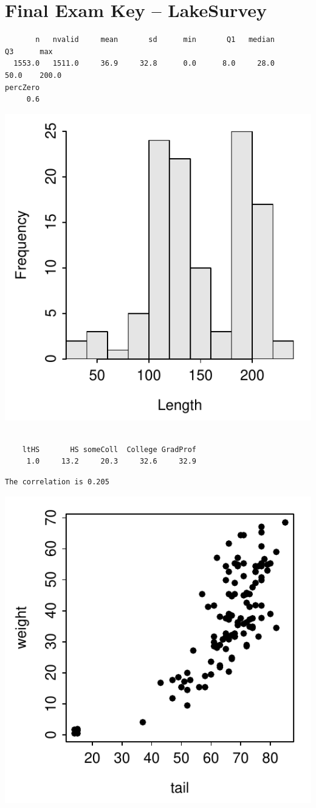\documentclass{article}\usepackage[]{graphicx}\usepackage[]{color}
\makeatletter
\newenvironment{kframe}{%
 \def\at@end@of@kframe{}%
 \ifinner\ifhmode%
  \def\at@end@of@kframe{\end{minipage}}%
  \begin{minipage}{\columnwidth}%
 \fi\fi%
 \def\FrameCommand##1{\hskip\@totalleftmargin \hskip-\fboxsep
 \colorbox{shadecolor}{##1}\hskip-\fboxsep
     \hskip-\linewidth \hskip-\@totalleftmargin \hskip\columnwidth}%
 \MakeFramed {\advance\hsize-\width
   \@totalleftmargin\z@ \linewidth\hsize
   \@setminipage}}%
 {\par\unskip\endMakeFramed%
 \at@end@of@kframe}
\newenvironment{knitrout}{}{} %
\makeatother
\begin{document}
\section*{Final Exam Key -- LakeSurvey}


\begin{knitrout}
\color{fgcolor}\begin{kframe}
\begin{verbatim}
       n   nvalid     mean       sd      min       Q1   median       Q3      max 
  1553.0   1511.0     36.9     32.8      0.0      8.0     28.0     50.0    200.0 
percZero 
     0.6 
\end{verbatim}
\end{kframe}

{\centering \includegraphics[width=.4\linewidth]{Figs/unnamed-chunk-1-1} 

}



\end{knitrout}
\begin{knitrout}
\color{fgcolor}\begin{kframe}
\begin{verbatim}

    ltHS       HS someColl  College GradProf 
     1.0     13.2     20.3     32.6     32.9 
\end{verbatim}
\end{kframe}
\end{knitrout}
\begin{knitrout}
\color{fgcolor}\begin{kframe}
\begin{verbatim}
The correlation is 0.205
\end{verbatim}
\end{kframe}

{\centering \includegraphics[width=.4\linewidth]{Figs/unnamed-chunk-3-1} 

}



\end{knitrout}
\end{document}
